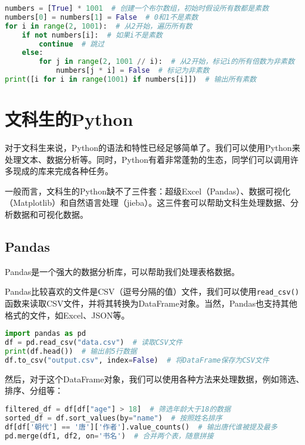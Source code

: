 \documentclass[../main.tex]{subfiles}
\begin{document}
\begin{lstlisting}[language=python]
numbers = [True] * 1001  # 创建一个布尔数组，初始时假设所有数都是素数
numbers[0] = numbers[1] = False  # 0和1不是素数
for i in range(2, 1001):  # 从2开始，遍历所有数
    if not numbers[i]:  # 如果i不是素数
        continue  # 跳过
    else:
        for j in range(2, 1001 // i):  # 从2开始，标记i的所有倍数为非素数
            numbers[j * i] = False  # 标记为非素数
print([i for i in range(1001) if numbers[i]])  # 输出所有素数
\end{lstlisting}

\section{文科生的Python}

对于文科生来说，Python的语法和特性已经足够简单了。我们可以使用Python来处理文本、数据分析等。同时，Python有着非常蓬勃的生态，同学们可以调用许多现成的库来完成各种任务。

一般而言，文科生的Python缺不了三件套：超级Excel（Pandas）、数据可视化（Matplotlib）和自然语言处理（jieba）。这三件套可以帮助文科生处理数据、分析数据和可视化数据。

\subsection{Pandas}

Pandas是一个强大的数据分析库，可以帮助我们处理表格数据。

Pandas比较喜欢的文件是CSV（逗号分隔的值）文件，我们可以使用\texttt{read\_csv()}函数来读取CSV文件，并将其转换为DataFrame对象。当然，Pandas也支持其他格式的文件，如Excel、JSON等。

\begin{lstlisting}[language=python]
import pandas as pd
df = pd.read_csv("data.csv")  # 读取CSV文件
print(df.head())  # 输出前5行数据
df.to_csv("output.csv", index=False)  # 将DataFrame保存为CSV文件
\end{lstlisting}

然后，对于这个DataFrame对象，我们可以使用各种方法来处理数据，例如筛选、排序、分组等：
\begin{lstlisting}[language=python]
filtered_df = df[df["age"] > 18]  # 筛选年龄大于18的数据
sorted_df = df.sort_values(by="name")  # 按照姓名排序
df[df['朝代'] == '唐']['作者'].value_counts()  # 输出唐代谁被提及最多
pd.merge(df1, df2, on='书名')  # 合并两个表，随意拼接
\end{lstlisting}
\end{document}
